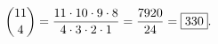 \[
\dbinom{11}{4}=\dfrac{11\cdot10\cdot9\cdot8}{4\cdot3\cdot2\cdot1}=\dfrac{7920}{24}=\boxed{330}.
\]
